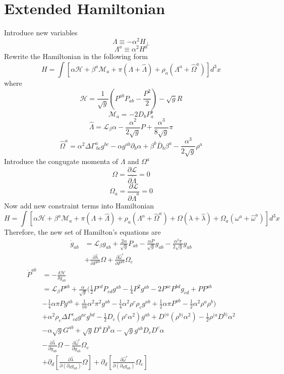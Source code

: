 \documentclass{article}
\begin{document}
\section{Extended Hamiltonian}
Introduce new variables
\[
\Lambda \equiv -\alpha^2 H_{\perp}
\]
\[
\Lambda^{a} \equiv \alpha^2 H^{a}
\]
Rewrite the Hamiltonian in the following form
\[
H = \int [\alpha \mathscr{H} + \beta^{a}\mathscr{M}_{a} + \pi (\Lambda + {\hat \Lambda}) + \rho_{a}(\Lambda^{a} + {\hat \Omega}^{a}) ]d^3 x
\]
where
\[
\mathscr{H} = \frac{1}{\sqrt{g}}(P^{ab}P_{ab} - \frac{P^2}{2}) - \sqrt{g}R
\]
\[
\mathscr{M}_{a} = -2D_{b}P^{b}_{a}
\]
\[
{\hat \Lambda} = \mathcal{L}_{\beta}\alpha - \frac{\alpha^2}{2\sqrt{g}}P + \frac{\alpha^3}{8\sqrt{g}}\pi
\]
\[
{\hat \Omega}^{a} = \alpha^2 \Delta \Gamma^{a}_{~bc}g^{bc} - \alpha g^{ab}\partial_{b} \alpha + \beta^{b}{\bar D}_{b} \beta^{a} - \frac{\alpha^3}{2\sqrt{g}}\rho^{a}
\]
Introduce the congugate momenta of $\Lambda$ and $\Omega^a$
\[
\Omega = \frac{\partial \mathscr{L}}{\partial {\dot \Lambda}} = 0
\]
\[
\Omega_{a} = \frac{\partial \mathscr{L}}{\partial {\dot \Lambda^{a}}} = 0
\]
Now add new constraint terms into Hamiltonian
\[
H = \int [\alpha \mathscr{H} + \beta^{a} \mathscr{M}_{a} + \pi (\Lambda + {\hat \Lambda}) + \rho_{a}(\Lambda^{a} + {\hat \Omega}^{a}) + \Omega(\lambda + {\hat \lambda}) +  \Omega_{a}(\omega^{a} + {\hat \omega}^{a})]d^3 x
\]
Therefore, the new set of Hamilton's equations are
\begin{align*}
{\dot g_{ab}} & = \mathcal{L}_{\beta}g_{ab} + \frac{2\alpha}{\sqrt{g}}P_{ab} - \frac{\alpha P}{\sqrt{g}}g_{ab} - \frac{\alpha^2 \pi }{2\sqrt{g}}g_{ab} \\
& + \frac{\partial {\hat \lambda}}{\partial P^{ab}}\Omega + \frac{\partial {\hat \omega}^{c}}{\partial P^{ab}}\Omega_{c}
\end{align*}
\begin{align*}
{\dot P^{ab}} & = -\frac{\delta \mathcal{H}}{\delta g_{ab}} \\ &
= \mathcal{L}_{\beta}P^{ab} + \frac{\alpha}{\sqrt{g}}(\frac{1}{2}P^{cd}P_{cd}g^{ab} - \frac{1}{4}P^{2}g^{ab} - 2P^{ac}P^{bd}g_{cd} + PP^{ab} \\
&-\frac{1}{4}\alpha \pi P g^{ab} + \frac{1}{16}\alpha^2 \pi^2 g^{ab} - \frac{1}{4}\alpha^2 \rho^{c}\rho_{c}g^{ab} + \frac{1}{2}\alpha \pi P^{ab} - \frac{1}{2}\alpha^2\rho^{a}\rho^{b}) \\
&+ \alpha^2 \rho_{e}\Delta \Gamma^{e}_{~cd}g^{ac}g^{bd} - \frac{1}{2}D_{c}(\rho^{c} \alpha^2)g^{ab} + D^{(a}(\rho^{b)} \alpha^2) - \frac{1}{2}\rho^{(a}D^{b)}\alpha^2\\
& - \alpha \sqrt{g}G^{ab} + \sqrt{g} D^{a}D^{b}\alpha - \sqrt{g}g^{ab}D_{c}D^{c} \alpha\\
& - \frac{\partial {\hat \lambda}}{\partial g_{ab}}\Omega - \frac{\partial {\hat \omega}^{c}}{\partial g_{ab}}\Omega_{c}\\
& + \partial_{d}[\frac{\partial {\hat \lambda}}{\partial(\partial_{d}g_{ab})}\Omega] + \partial_{d}[\frac{\partial {\hat \omega^{c}}}{\partial(\partial_{d}g_{ab})}\Omega_{c}]
\end{align*}
\end{document}
